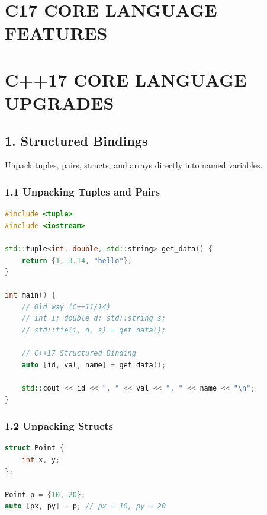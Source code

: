 \hypertarget{c17-core-language-features}{%
\chapter{C17 CORE LANGUAGE FEATURES}\label{c17-core-language-features}}

\hypertarget{c17-core-language-upgrades}{%
\chapter{C++17 CORE LANGUAGE
UPGRADES}\label{c17-core-language-upgrades}}

\hypertarget{structured-bindings}{%
\section{1. Structured Bindings}\label{structured-bindings}}

Unpack tuples, pairs, structs, and arrays directly into named variables.

\hypertarget{unpacking-tuples-and-pairs}{%
\subsection{1.1 Unpacking Tuples and
Pairs}\label{unpacking-tuples-and-pairs}}

\begin{lstlisting}[language={C++}]
#include <tuple>
#include <iostream>

std::tuple<int, double, std::string> get_data() {
    return {1, 3.14, "hello"};
}

int main() {
    // Old way (C++11/14)
    // int i; double d; std::string s;
    // std::tie(i, d, s) = get_data();

    // C++17 Structured Binding
    auto [id, val, name] = get_data();
    
    std::cout << id << ", " << val << ", " << name << "\n";
}
\end{lstlisting}

\hypertarget{unpacking-structs}{%
\subsection{1.2 Unpacking Structs}\label{unpacking-structs}}

\begin{lstlisting}[language={C++}]
struct Point {
    int x, y;
};

Point p = {10, 20};
auto [px, py] = p; // px = 10, py = 20
\end{lstlisting}

